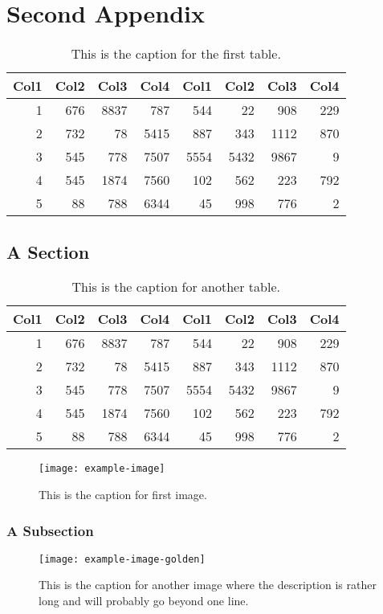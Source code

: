 \chapter{Second Appendix}
\lipsum[1]
\begin{table}
	\centering
	\begin{tabular}{r r r r r r r r}
		Col1 & Col2 & Col3 & Col4 & Col1 & Col2 & Col3 & Col4 \\
		\hline
		1    & 676  & 8837 & 787  & 544  & 22   & 908  & 229  \\
		2    & 732  & 78   & 5415 & 887  & 343  & 1112 & 870  \\
		3    & 545  & 778  & 7507 & 5554 & 5432 & 9867 & 9    \\
		4    & 545  & 1874 & 7560 & 102  & 562  & 223  & 792  \\
		5    & 88   & 788  & 6344 & 45   & 998  & 776  & 2    \\
		\hline
	\end{tabular}
	\caption{This is the caption for the first table.}
\end{table}
\lipsum[2]

\section{A Section}
\lipsum[3]
\begin{table}
	\centering
	\begin{tabular}{r r r r r r r r}
		Col1 & Col2 & Col3 & Col4 & Col1 & Col2 & Col3 & Col4 \\
		\hline
		1    & 676  & 8837 & 787  & 544  & 22   & 908  & 229  \\
		2    & 732  & 78   & 5415 & 887  & 343  & 1112 & 870  \\
		3    & 545  & 778  & 7507 & 5554 & 5432 & 9867 & 9    \\
		4    & 545  & 1874 & 7560 & 102  & 562  & 223  & 792  \\
		5    & 88   & 788  & 6344 & 45   & 998  & 776  & 2    \\
		\hline
	\end{tabular}
	\caption{This is the caption for another table.}
\end{table}
\lipsum[4-5]
\begin{figure}
	\centering
	\texttt{[image: example-image]}
	\caption{This is the caption for first image.}
\end{figure}

\subsection{A Subsection}
\lipsum[6-8]
\begin{figure}
	\centering
	\texttt{[image: example-image-golden]}
	\caption{This is the caption for another image where the description is rather long and will probably go beyond one line.}
\end{figure}

